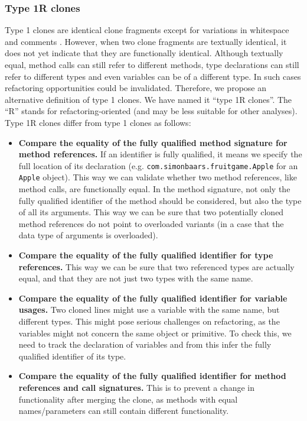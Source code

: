 \documentclass[a4paper]{article}
\begin{document}
\subsubsection{Type 1R clones} \label{chap:type1clones}
Type 1 clones are identical clone fragments except for variations in whitespace and comments \cite{roy2007survey}. However, when two clone fragments are textually identical, it does not yet indicate that they are functionally identical. Although textually equal, method calls can still refer to different methods, type declarations can still refer to different types and even variables can be of a different type. In such cases refactoring opportunities could be invalidated. Therefore, we propose an alternative definition of type 1 clones. We have named it ``type 1R clones''. The ``R'' stands for refactoring-oriented (and may be less suitable for other analyses). Type 1R clones differ from type 1 clones as follows:
\begin{itemize}
  \item \textbf{Compare the equality of the fully qualified method signature for method references.} If an identifier is fully qualified, it means we specify the full location of its declaration (e.g. \texttt{com.simonbaars.fruitgame.Apple} for an \texttt{Apple} object). This way we can validate whether two method references, like method calls, are functionally equal. In the method signature, not only the fully qualified identifier of the method should be considered, but also the type of all its arguments. This way we can be sure that two potentially cloned method references do not point to overloaded variants (in a case that the data type of arguments is overloaded).
  \item \textbf{Compare the equality of the fully qualified identifier for type references.} This way we can be sure that two referenced types are actually equal, and that they are not just two types with the same name.
  \item \textbf{Compare the equality of the fully qualified identifier for variable usages.} Two cloned lines might use a variable with the same name, but different types. This might pose serious challenges on refactoring, as the variables might not concern the same object or primitive. To check this, we need to track the declaration of variables and from this infer the fully qualified identifier of its type.
  \item \textbf{Compare the equality of the fully qualified identifier for method references and call signatures.} This is to prevent a change in functionality after merging the clone, as methods with equal names/parameters can still contain different functionality.
\end{itemize}
\end{document}
